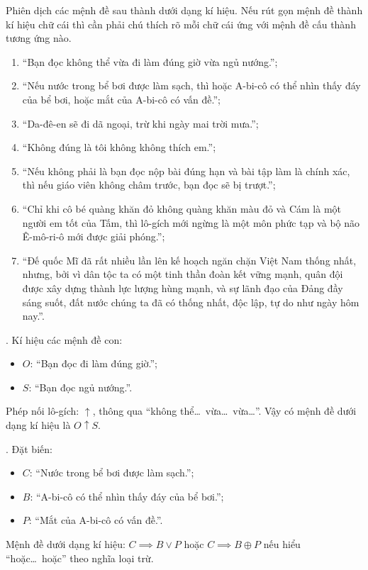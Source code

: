 \exercise Phiên dịch các mệnh đề sau thành dưới dạng kí hiệu. Nếu rút gọn mệnh đề thành kí hiệu chữ cái thì cần phải chú thích rõ mỗi chữ cái ứng với mệnh đề cấu thành tương ứng nào.
\begin{enumerate}
    \item ``Bạn đọc không thể vừa đi làm đúng giờ vừa ngủ nướng.'';
    \item ``Nếu nước trong bể bơi được làm sạch, thì hoặc A-bi-cô có thể nhìn thấy đáy của bể bơi, hoặc mắt của A-bi-cô có vấn đề.'';
    \item ``Da-đê-en sẽ đi dã ngoại, trừ khi ngày mai trời mưa.'';
    \item ``Không đúng là tôi không không thích em.'';
    \item ``Nếu không phải là bạn đọc nộp bài đúng hạn và bài tập làm là chính xác, thì nếu giáo viên không châm trước, bạn đọc sẽ bị trượt.'';
    \item ``Chỉ khi cô bé quàng khăn đỏ không quàng khăn màu đỏ và Cám là một người em tốt của Tấm, thì lô-gích mới ngừng là một môn phức tạp và bộ não Ê-mô-ri-ô mới được giải phóng.'';
    \item ``Đế quốc Mĩ đã rất nhiều lần lên kế hoạch ngăn chặn Việt Nam thống nhất, nhưng, bởi vì dân tộc ta có một tinh thần đoàn kết vững mạnh, quân đội được xây dựng thành lực lượng hùng mạnh, và sự lãnh đạo của Đảng đầy sáng suốt, đất nước chúng ta đã có thống nhất, độc lập, tự do như ngày hôm nay.''.
\end{enumerate}

\solution

\setcounter{subexercise}{1}
. 
Kí hiệu các mệnh đề con:
\begin{itemize}
    \item $O$: ``Bạn đọc đi làm đúng giờ.'';
    \item $S$: ``Bạn đọc ngủ nướng.''.
\end{itemize}
Phép nối lô-gích: $\uparrow$, thông qua ``không thể\dots\ vừa\dots\ vừa\dots''. Vậy có mệnh đề dưới dạng kí hiệu là $O \uparrow S$.

. Đặt biến:
\begin{itemize}
    \item $C$: ``Nước trong bể bơi được làm sạch.'';
    \item $B$: ``A-bi-cô có thể nhìn thấy đáy của bể bơi.'';
    \item $P$: ``Mắt của A-bi-cô có vấn đề.''.
\end{itemize}
Mệnh đề dưới dạng kí hiệu: $C \implies B \lor P$ hoặc $C \implies B \oplus P$ nếu hiểu ``hoặc\dots\ hoặc'' theo nghĩa loại trừ.

